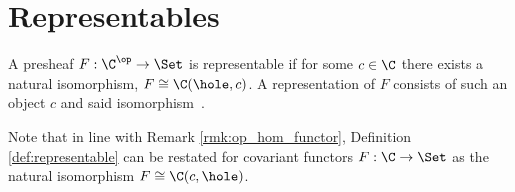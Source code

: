 \section{Representables}

\begin{definition}
  A presheaf $F: \C^\op\to \Set$ is representable if for some $c\in\C$ there
  exists a natural isomorphism, $F \cong \C(\hole, c)$. A representation of $F$
  consists of such an object $c$ and said
  isomorphism~\parencite[p.~84]{leinster:basic_category_theory}.
\end{definition}

\begin{remark}
  Note that in line with Remark \ref{rmk:op_hom_functor}, Definition
  \ref{def:representable} can be restated for covariant functors $F:\C\to\Set$ as the natural isomorphism $F\cong \C(c, \hole)$.
\end{remark}